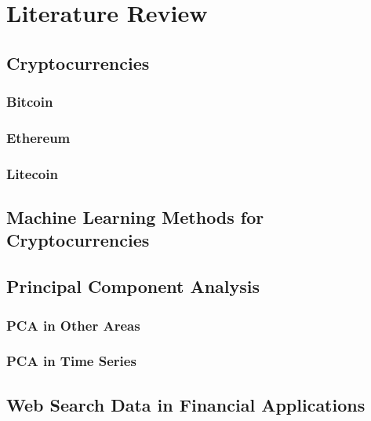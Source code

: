\chapter{Literature Review}
\label{chap:two}


\section{Cryptocurrencies}
\label{sec:crypto}

\subsection{Bitcoin}

\subsection{Ethereum}

\subsection{Litecoin}


\section{Machine Learning Methods for Cryptocurrencies}
\label{sec:ml}

\section{Principal Component Analysis}
\label{sec:pca}


\subsection{PCA in Other Areas}

\subsection{PCA in Time Series}


\section{Web Search Data in Financial Applications}





